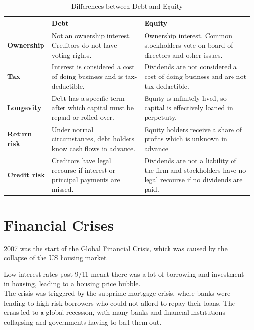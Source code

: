 \begin{table}[htbp]
    \centering
    \caption{Differences between Debt and Equity}
    \label{tab:debt-equity}
    \begin{tabular}{@{}>{\raggedright}p{2.5cm}>{\raggedright\arraybackslash}p{5.5cm}>{\raggedright\arraybackslash}p{5.5cm}@{}}
    \toprule
     & \textbf{Debt} & \textbf{Equity} \\ \midrule
    \textbf{Ownership} & Not an ownership interest. Creditors do not have voting rights. & Ownership interest. Common stockholders vote on board of directors and other issues. \\
    \textbf{Tax} & Interest is considered a cost of doing business and is tax-deductible. & Dividends are not considered a cost of doing business and are not tax-deductible. \\
    \textbf{Longevity} & Debt has a specific term after which capital must be repaid or rolled over. & Equity is infinitely lived, so capital is effectively loaned in perpetuity. \\
    \textbf{Return risk} & Under normal circumstances, debt holders know cash flows in advance. & Equity holders receive a share of profits which is unknown in advance. \\
    \textbf{Credit risk} & Creditors have legal recourse if interest or principal payments are missed. & Dividends are not a liability of the firm and stockholders have no legal recourse if no dividends are paid. \\
    \bottomrule
    \end{tabular}

\end{table}


    
\section{Financial Crises}
2007 was the start of the Global Financial Crisis, which was caused by the collapse of the US housing market. 


Low interest rates post-9/11 meant there was a lot of borrowing and investment in housing, leading to a housing price bubble. \\

The crisis was triggered by the subprime mortgage crisis, where banks were lending to high-risk borrowers who could not afford to repay their loans. The crisis led to a global recession, with many banks and financial institutions collapsing and governments having to bail them out. \\

